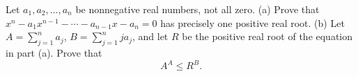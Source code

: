 Let $a_1, a_2, \ldots, a_n$ be nonnegative real numbers, not all zero.
(a) Prove that $x^n - a_1 x^{n-1} - \cdots - a_{n-1} x - a_n = 0$ has precisely one positive real root.
(b) Let $A = \sum_{j=1}^{n} a_j$, $B = \sum_{j=1}^{n} j a_j$, and let $R$ be the positive real root of the equation in part (a). Prove that
\[
A^A \leq R^B.
\]
